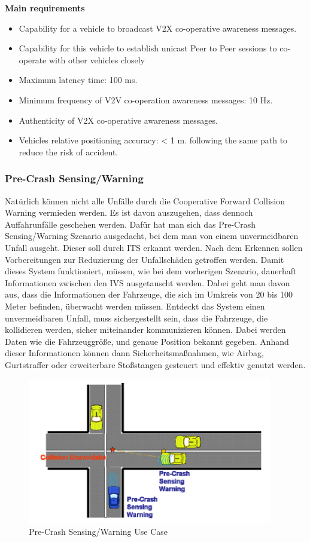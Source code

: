 \textbf{Main requirements}
\begin{itemize}
\item Capability for a vehicle to broadcast V2X co-operative awareness messages.
\item Capability for this vehicle to establish unicast Peer to Peer sessions to co-operate with other vehicles closely
\item Maximum latency time: 100 ms.
\item Minimum frequency of V2V co-operation awareness messages: 10 Hz.
\item Authenticity of V2X co-operative awareness messages.
\item Vehicles relative positioning accuracy: < 1 m.
following the same path to reduce the risk of accident.
\end{itemize}

\subsubsection{Pre-Crash Sensing/Warning}
Natürlich können nicht alle Unfälle durch die Cooperative Forward Collision Warning vermieden werden. Es ist davon auszugehen, dass dennoch Auffahrunfälle geschehen werden. Dafür hat man sich das Pre-Crash Sensing/Warning Szenario ausgedacht, bei dem man von einem unvermeidbaren Unfall ausgeht. Dieser soll durch \ac{ITS} erkannt werden. Nach dem Erkennen sollen Vorbereitungen zur Reduzierung der Unfallschäden getroffen werden. Damit dieses System funktioniert, müssen, wie bei dem vorherigen Szenario, dauerhaft Informationen zwischen den \ac{IVS} ausgetauscht werden. Dabei geht man davon aus, dass die Informationen der Fahrzeuge, die sich im Umkreis von 20 bis 100 Meter befinden, überwacht werden müssen. Entdeckt das System einen unvermeidbaren Unfall, muss sichergestellt sein, dass die Fahrzeuge, die kollidieren werden, sicher miteinander kommunizieren können. Dabei werden Daten wie die Fahrzeuggröße, und genaue Position bekannt gegeben. Anhand dieser Informationen können dann Sicherheitsmaßnahmen, wie Airbag, Gurtstraffer oder erweiterbare Stoßstangen gesteuert und effektiv genutzt werden. 

\begin{figure}[htbp]
	\includegraphics[width=0.95\textwidth]{content/images/06_use_cases/pre_crash_sensing.png}
	\caption{Pre-Crash Sensing/Warning Use Case \cite{etsi102638}}
	\label{fig:pcs}
\end{figure}

